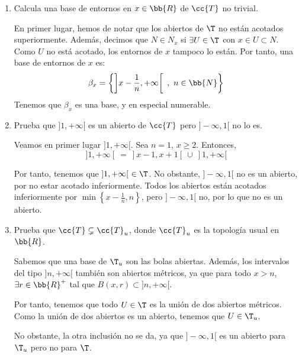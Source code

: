 \begin{ejercicio}
\begin{enumerate}[label=\alph*)]
\begin{enumerate}
\begin{itemize}
                Por tanto, definimos $B_3=\left]z-\frac{1}{n_3}, z+\frac{1}{n_3}\right[ ~~\bigcup~~ ]n_3,+\infty[$, y tenemos que $z\in B_3$ y $B_3\subset B_1\cap B_2$.
            \end{itemize}
        \end{enumerate}

        \item Calcula una base de entornos en $x\in \bb{R}$ de $\cc{T}$ no trivial.

        En primer lugar, hemos de notar que los abiertos de $\T$ no están acotados superiormente. Además, decimos que $N\in N_x$ si $\exists U\in \T$ con $x\in U\subset N$. Como $U$ no está acotado, los entornos de $x$ tampoco lo están. Por tanto, una base de entornos de $x$ es:
        \begin{equation*}
            \beta_x=\left\{\left]x-\frac{1}{n}, +\infty \right[~,~n\in \bb{N}\right\}
        \end{equation*}
        Tenemos que $\beta_x$ es una base, y en especial numerable.

        \item Prueba que $]1,+\infty[$ es un abierto de $\cc{T}$ pero $]-\infty, 1[$ no lo es.

        Veamos en primer lugar $]1,+\infty[$. Sea $n=1$, $x\geq 2$. Entonces,
        \begin{equation*}
            ]1,+\infty[~=~]x-1, x+1[~\cup~]1,+\infty[ 
        \end{equation*}

        Por tanto, tenemos que $]1,+\infty[~\in  \T$. No obstante, $]-\infty, 1[$ no es un abierto, por no estar acotado inferiormente. Todos los abiertos están acotados inferiormente por $\min\left\{x-\frac{1}{n}, n\right\}$, pero $]-\infty, 1[$ no, por lo que no es un abierto.

        \item Prueba que $\cc{T}\subsetneq \cc{T}_u$, donde $\cc{T}_u$ es la topología usual en $\bb{R}$.

        Sabemos que una base de $\T_u$ son las bolas abiertas. Además, los intervalos del tipo $]n,+\infty[$ también son abiertos métricos, ya que para todo $x>n$, $\exists r\in \bb{R}^+$ tal que $B(x,r)\subset ]n,+\infty[$.

        Por tanto, tenemos que todo $U\in \T$ es la unión de dos abiertos métricos. Como la unión de dos abiertos es un abierto, tenemos que $U\in \T_u$.
        
        No obstante, la otra inclusión no se da, ya que $]-\infty, 1[$ es un abierto para $\T_u$ pero no para $\T$.


\end{enumerate}
\end{ejercicio}
